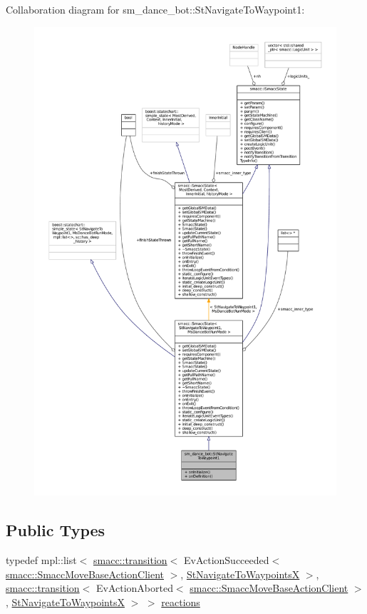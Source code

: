 Collaboration diagram for sm\+\_\+dance\+\_\+bot\+:\+:St\+Navigate\+To\+Waypoint1\+:
\nopagebreak
\begin{figure}[H]
\begin{center}
\leavevmode
\includegraphics[width=350pt]{structsm__dance__bot_1_1StNavigateToWaypoint1__coll__graph}
\end{center}
\end{figure}
\subsection*{Public Types}
\begin{DoxyCompactItemize}
\item 
typedef mpl\+::list$<$ \hyperlink{classsmacc_1_1transition}{smacc\+::transition}$<$ Ev\+Action\+Succeeded$<$ \hyperlink{classsmacc_1_1SmaccMoveBaseActionClient}{smacc\+::\+Smacc\+Move\+Base\+Action\+Client} $>$, \hyperlink{structsm__dance__bot_1_1StNavigateToWaypointsX}{St\+Navigate\+To\+WaypointsX} $>$, \hyperlink{classsmacc_1_1transition}{smacc\+::transition}$<$ Ev\+Action\+Aborted$<$ \hyperlink{classsmacc_1_1SmaccMoveBaseActionClient}{smacc\+::\+Smacc\+Move\+Base\+Action\+Client} $>$, \hyperlink{structsm__dance__bot_1_1StNavigateToWaypointsX}{St\+Navigate\+To\+WaypointsX} $>$ $>$ \hyperlink{structsm__dance__bot_1_1StNavigateToWaypoint1_a862635c188fcb82195c97223b2d6dd66}{reactions}
\end{DoxyCompactItemize}
